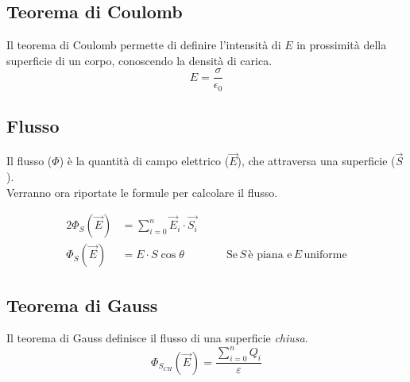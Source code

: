 \subsection{Teorema di Coulomb}
Il teorema di Coulomb permette di definire l'intensità di $E$ in prossimità della superficie di un
corpo, conoscendo la densità di carica.
\begin{equation*}
  E = \frac{\sigma}{\epsilon_0}
\end{equation*}

\subsection{Flusso} \label{subsec:flusso}
Il flusso ($\Phi$) è la quantità di campo elettrico ($\vec{E}$), che 
attraversa una superficie ($\vec{S}$).\\
Verranno ora riportate le formule per calcolare il flusso.

\begin{alignat*}{2}
  \Phi_S\left(\vec{E}\right) &= \sum\limits_{i=0}^{n}\vec{E}_i\cdot\vec{S_i} &\quad &\\
  \Phi_S\left(\vec{E}\right) &= E\cdot S\cos\theta & &\text{Se}\,S\,\text{è piana e}\,E\,
  \text{uniforme} 
\end{alignat*}
\begin{center}
\end{center}

\subsection{Teorema di Gauss}
Il teorema di Gauss definisce il flusso di una superficie \emph{chiusa}.
\begin{equation*}
  \Phi_{S_{CH}}\left(\vec{E}\right) = \frac{\sum\limits_{i=0}^{n}Q_i}{\varepsilon}
\end{equation*}

